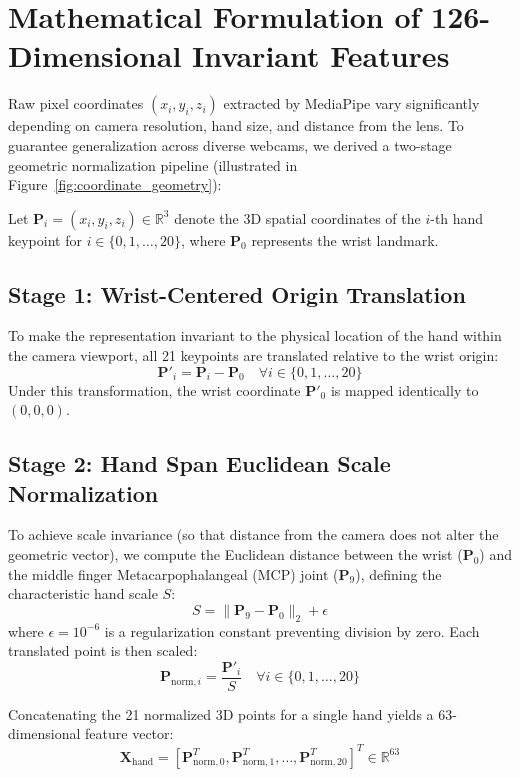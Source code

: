 \section{Mathematical Formulation of 126-Dimensional Invariant Features}
Raw pixel coordinates $(x_i, y_i, z_i)$ extracted by MediaPipe vary significantly depending on camera resolution, hand size, and distance from the lens. To guarantee generalization across diverse webcams, we derived a two-stage geometric normalization pipeline (illustrated in Figure~\ref{fig:coordinate_geometry}):

Let $\mathbf{P}_i = (x_i, y_i, z_i) \in \mathbb{R}^3$ denote the 3D spatial coordinates of the $i$-th hand keypoint for $i \in \{0, 1, \dots, 20\}$, where $\mathbf{P}_0$ represents the wrist landmark.

\subsection{Stage 1: Wrist-Centered Origin Translation}
To make the representation invariant to the physical location of the hand within the camera viewport, all 21 keypoints are translated relative to the wrist origin:
\begin{equation}
\mathbf{P}'_i = \mathbf{P}_i - \mathbf{P}_0 \quad \forall i \in \{0, 1, \dots, 20\}
\end{equation}
Under this transformation, the wrist coordinate $\mathbf{P}'_0$ is mapped identically to $(0, 0, 0)$.

\subsection{Stage 2: Hand Span Euclidean Scale Normalization}
To achieve scale invariance (so that distance from the camera does not alter the geometric vector), we compute the Euclidean distance between the wrist ($\mathbf{P}_0$) and the middle finger Metacarpophalangeal (MCP) joint ($\mathbf{P}_9$), defining the characteristic hand scale $S$:
\begin{equation}
S = \|\mathbf{P}_9 - \mathbf{P}_0\|_2 + \epsilon
\end{equation}
where $\epsilon = 10^{-6}$ is a regularization constant preventing division by zero. Each translated point is then scaled:
\begin{equation}
\mathbf{P}_{\text{norm}, i} = \frac{\mathbf{P}'_i}{S} \quad \forall i \in \{0, 1, \dots, 20\}
\end{equation}

Concatenating the 21 normalized 3D points for a single hand yields a 63-dimensional feature vector:
\begin{equation}
\mathbf{X}_{\text{hand}} = \left[ \mathbf{P}_{\text{norm}, 0}^T, \mathbf{P}_{\text{norm}, 1}^T, \dots, \mathbf{P}_{\text{norm}, 20}^T \right]^T \in \mathbb{R}^{63}
\end{equation}

